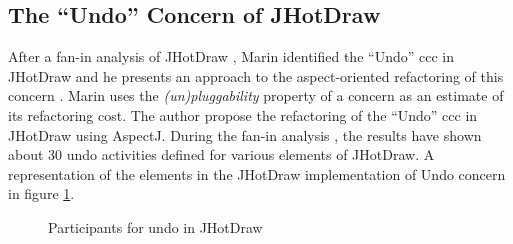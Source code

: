 
\subsection{The ``Undo'' Concern of JHotDraw}\label{The Undo Concern of JHotDraw}
After a fan-in analysis of JHotDraw \cite{marin2004identifying}, Marin identified the  ``Undo'' \ac{ccc} in JHotDraw and he presents an approach to the aspect-oriented refactoring of this concern \cite{marin2004refactoring}. 
Marin uses the \textit{(un)pluggability} property of a concern as an estimate of its refactoring cost. 
The author propose the refactoring of the ``Undo'' \ac{ccc} in JHotDraw using AspectJ. 
During the fan-in analysis \cite{marin2004identifying}, the results have shown about 30 undo activities defined for various elements of JHotDraw. 
A representation of the elements in the JHotDraw implementation of Undo concern in figure \ref{fig:Participants_for_undo_in_JHotDraw}.

\begin{figure}[h]
	\centering
  	\caption{Participants for undo in JHotDraw \cite{marin2004refactoring}}
  	\label{fig:Participants_for_undo_in_JHotDraw}
\end{figure}

